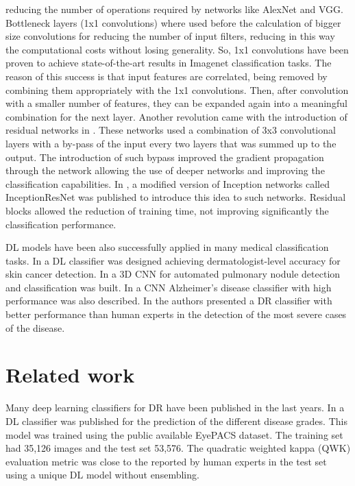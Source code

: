 reducing the number of operations required by networks like AlexNet and VGG. Bottleneck layers (1x1 convolutions) where used before the calculation of bigger size convolutions for reducing the number of input filters, reducing in this way the computational costs without losing generality. So, 1x1 convolutions have been proven to achieve state-of-the-art results in Imagenet classification tasks. The reason of this success is that input features are correlated, being removed by combining them appropriately with the 1x1 convolutions. Then, after convolution with a smaller number of features, they can be expanded again into a meaningful combination for the next layer. Another revolution came with the introduction of residual networks in \citep{he2016deep}. These networks used a combination of 3x3 convolutional layers with a by-pass of the input every two layers that was summed up to the output. The introduction of such bypass improved the gradient propagation through the network allowing the use of deeper networks and improving the classification capabilities. In \citep{szegedy2017inception}, a modified version of Inception networks called InceptionResNet was published to introduce this idea to such networks. Residual blocks allowed the reduction of training time, not improving significantly the classification performance. 

DL models have been also successfully applied  in many medical classification tasks. In \citep{esteva2017dermatologist} a DL classifier was designed achieving dermatologist-level accuracy for skin cancer detection. In \citep{wentao2018deeplung} a 3D CNN for automated pulmonary nodule detection and classification was built. In \citep{wang2018classification} a CNN Alzheimer's disease classifier with high performance was also described. In \citep{doi:10.1001/jama.2016.17216} the authors presented a DR classifier with better performance than human experts in the detection of the most severe cases of the disease.

\section{Related work}\label{class2:sec:related}

Many deep learning classifiers for DR have been published in the last years. In \citep{delatorre2017} a DL classifier was published for the prediction of the different disease grades. This model was trained using the public available EyePACS dataset. The training set had 35,126 images and the test set 53,576. The quadratic weighted kappa (QWK) evaluation metric \citep{cohen1968weighted} was close to the reported by human experts in the test set using a unique DL model without ensembling. 

